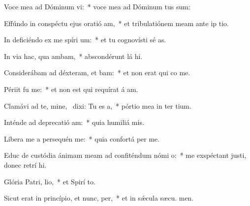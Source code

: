 \item Voce mea ad Dóminum vi:~* voce mea ad Dóminum tus sum:
\item Effúndo in conspéctu ejus oratió am,~* et tribulatiónem meam ante ip tio.
\item In deficiéndo ex me spíri um:~* et tu cognovísti sé as.
\item In via hac, qua ambam,~* abscondérunt lá hi.
\item Considerábam ad déxteram, et bam:~* et non erat qui co me.
\item Périit fu  me:~* et non est qui requírat á am.
\item Clamávi ad te, mine,~\pscross{} dixi: Tu es  a,~* pórtio mea in ter tium.
\item Inténde ad deprecatió am:~* quia humiliá  mis.
\item Líbera me a persequén me:~* quia confortá  per me.
\item Educ de custódia ánimam meam ad confiténdum nómi o:~* me exspéctant justi, donec retrí hi.
\item Glória Patri,  lio,~* et Spirí to.
\item Sicut erat in princípio, et nunc,  per,~* et in sǽcula sæcu. men.
